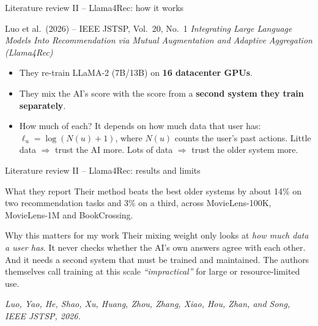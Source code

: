 \documentclass[aspectratio=169,12pt]{beamer}
\newcommand{\source}[1]{\vspace{0.35em}\par{\tiny\color{Muted}\textit{#1}}}
\begin{document}
\begin{frame}{Literature review II -- Llama4Rec: how it works}
\begin{block}{Luo et al.\ (2026) -- IEEE JSTSP, Vol.\ 20, No.\ 1}
\emph{Integrating Large Language Models Into Recommendation via Mutual
Augmentation and Adaptive Aggregation (Llama4Rec)}
\end{block}

\vspace{0.6em}
\begin{itemize}
  \item They re-train LLaMA-2 (7B/13B) on \textbf{16 datacenter GPUs}.
  \item They mix the AI's score with the score from a \textbf{second system
        they train separately}.
  \item How much of each? It depends on how much data that user has:
        $\ell_u = \log(N(u){+}1)$, where $N(u)$ counts the user's past
        actions. Little data $\Rightarrow$ trust the AI more. Lots of data
        $\Rightarrow$ trust the older system more.
\end{itemize}
\end{frame}

\begin{frame}{Literature review II -- Llama4Rec: results and limits}
\begin{block}{What they report}
Their method beats the best older systems by about 14\% on two
recommendation tasks and 3\% on a third, across MovieLens-100K,
MovieLens-1M and BookCrossing.
\end{block}

\vspace{0.5em}
\begin{alertblock}{Why this matters for my work}
Their mixing weight only looks at \emph{how much data a user has}. It never
checks whether the AI's own answers agree with each other. And it needs a
second system that must be trained and maintained. The authors themselves
call training at this scale \emph{``impractical''} for large or
resource-limited use.
\end{alertblock}
\source{Luo, Yao, He, Shao, Xu, Huang, Zhou, Zhang, Xiao, Hou, Zhan, and Song, IEEE JSTSP, 2026.}
\end{frame}
\end{document}
